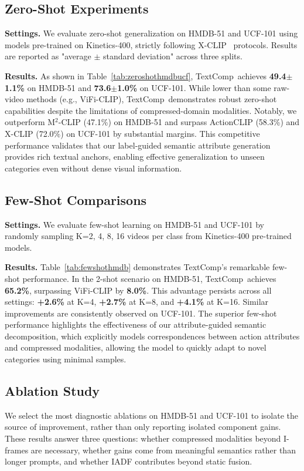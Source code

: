 \documentclass[letterpaper]{article} %
\newcommand{\methodname}{TextComp}
\begin{document}
\subsection{Zero-Shot Experiments}
\noindent\textbf{Settings.} We evaluate zero-shot generalization on HMDB-51 and UCF-101 using models pre-trained on Kinetics-400, strictly following X-CLIP~\cite{ni2022expanding} protocols. Results are reported as "average \ensuremath{\pm} standard deviation" across three splits.

\noindent\textbf{Results.} As shown in Table~\ref{tab:zeroshothmdbucf}, \methodname~achieves \textbf{49.4\ensuremath{\pm}1.1\%} on HMDB-51 and \textbf{73.6\ensuremath{\pm}1.0\%} on UCF-101. While lower than some raw-video methods (e.g., ViFi-CLIP), \methodname~demonstrates robust zero-shot capabilities despite the limitations of compressed-domain modalities. Notably, we outperform M\ensuremath{^2}-CLIP (47.1\%) on HMDB-51 and surpass ActionCLIP (58.3\%) and X-CLIP (72.0\%) on UCF-101 by substantial margins. This competitive performance validates that our label-guided semantic attribute generation provides rich textual anchors, enabling effective generalization to unseen categories even without dense visual information.

\subsection{Few-Shot Comparisons}
\noindent\textbf{Settings.} We evaluate few-shot learning on HMDB-51 and UCF-101 by randomly sampling K={2, 4, 8, 16} videos per class from Kinetics-400 pre-trained models.

\noindent\textbf{Results.} Table~\ref{tab:fewshothmdb} demonstrates \methodname's remarkable few-shot performance. In the 2-shot scenario on HMDB-51, \methodname~achieves \textbf{65.2\%}, surpassing ViFi-CLIP by \textbf{8.0\%}. This advantage persists across all settings: \textbf{+2.6\%} at K=4, \textbf{+2.7\%} at K=8, and \textbf{+4.1\%} at K=16. Similar improvements are consistently observed on UCF-101. The superior few-shot performance highlights the effectiveness of our attribute-guided semantic decomposition, which explicitly models correspondences between action attributes and compressed modalities, allowing the model to quickly adapt to novel categories using minimal samples.


\subsection{Ablation Study}
We select the most diagnostic ablations on HMDB-51 and UCF-101 to isolate the source of improvement, rather than only reporting isolated component gains. These results answer three questions: whether compressed modalities beyond I-frames are necessary, whether gains come from meaningful semantics rather than longer prompts, and whether IADF contributes beyond static fusion.
\end{document}
